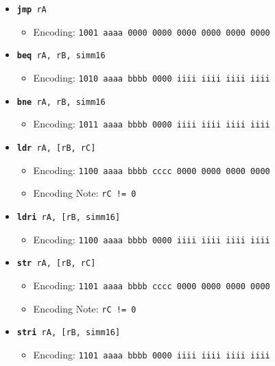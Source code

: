 \documentclass{article}
\begin{document}
\begin{itemize}
		\item \texttt{\textbf{jmp} rA}
		\begin{itemize}
			\item Encoding: 
				\texttt{1001 aaaa 0000 0000  0000 0000 0000 0000}
		\end{itemize}

		\item \texttt{\textbf{beq} rA, rB, simm16}
		\begin{itemize}
			\item Encoding: 
				\texttt{1010 aaaa bbbb 0000  iiii iiii iiii iiii}
		\end{itemize}

		\item \texttt{\textbf{bne} rA, rB, simm16}
		\begin{itemize}
			\item Encoding: 
				\texttt{1011 aaaa bbbb 0000  iiii iiii iiii iiii}
		\end{itemize}

		\item \texttt{\textbf{ldr} rA, [rB, rC]}
		\begin{itemize}
			\item Encoding: 
				\texttt{1100 aaaa bbbb cccc  0000 0000 0000 0000}
			\item Encoding Note:  \texttt{rC != 0}
		\end{itemize}
		\item \texttt{\textbf{ldri} rA, [rB, simm16]}
		\begin{itemize}
			\item Encoding: 
				\texttt{1100 aaaa bbbb 0000  iiii iiii iiii iiii}
		\end{itemize}

		\item \texttt{\textbf{str} rA, [rB, rC]}
		\begin{itemize}
			\item Encoding: 
				\texttt{1101 aaaa bbbb cccc  0000 0000 0000 0000}
			\item Encoding Note:  \texttt{rC != 0}
		\end{itemize}
		\item \texttt{\textbf{stri} rA, [rB, simm16]}
		\begin{itemize}
			\item Encoding: 
				\texttt{1101 aaaa bbbb 0000  iiii iiii iiii iiii}
		\end{itemize}

	\end{itemize}


\end{document}
